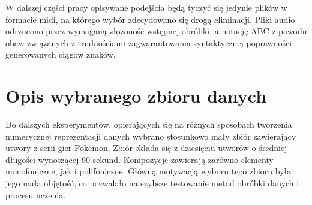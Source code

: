 {{{            W dalszej części pracy opisywane podejścia będą tyczyć się jedynie plików w formacie midi, na którego 
            wybór zdecydowano się drogą eliminacji. Pliki audio odrzucono przez wymaganą złożoność wstępnej obróbki,
            a notację ABC z powodu obaw związanych z trudnościami zagwarantowania syntaktycznej poprawności 
            generowanych ciągów znaków.
        }
    }

    \section{Opis wybranego zbioru danych}
    {
        Do dalszych eksperymentów, opierających się na różnych sposobach tworzenia numerycznej reprezentacji
        danych wybrano stosunkowo mały zbiór zawierający utwory z serii gier Pokemon.
        Zbiór składa się z dziesięciu utworów o średniej długości wynoszącej 90 sekund. Kompozycje zawierają zarówno 
        elementy monofoniczne, jak i polifoniczne. Główną motywacją wyboru tego zbioru była jego mała objętość,
        co pozwalało na szybsze testowanie metod obróbki danych i procesu uczenia.
    }
}